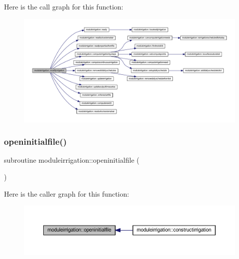 Here is the call graph for this function\+:\nopagebreak
\begin{figure}[H]
\begin{center}
\leavevmode
\includegraphics[width=350pt]{namespacemoduleirrigation_a1b4b8c33ee265298e1bf3cb4d19f6762_cgraph}
\end{center}
\end{figure}
\mbox{\label{namespacemoduleirrigation_a2334c75854146c9d46127bcb0e0c54f2}} 
\subsubsection{\texorpdfstring{openinitialfile()}{openinitialfile()}}
{\footnotesize\ttfamily subroutine moduleirrigation\+::openinitialfile (\begin{DoxyParamCaption}{ }\end{DoxyParamCaption})\hspace{0.3cm}{\ttfamily [private]}}

Here is the caller graph for this function\+:\nopagebreak
\begin{figure}[H]
\begin{center}
\leavevmode
\includegraphics[width=350pt]{namespacemoduleirrigation_a2334c75854146c9d46127bcb0e0c54f2_icgraph}
\end{center}
\end{figure}
\mbox{\label{namespacemoduleirrigation_ae53033583e6896d868b4b65aa406c69f}} 
